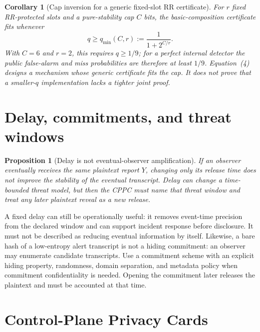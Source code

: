 \documentclass[11pt]{article}
\newtheorem{corollary}{Corollary}
\newtheorem{proposition}{Proposition}
\begin{document}
\begin{corollary}[Cap inversion for a generic fixed-slot RR certificate]
\label{cor:rr-cap-inversion}
For $r$ fixed RR-protected slots and a pure-stability cap $C$ bits, the basic-composition certificate fits whenever
\[
q\ge q_{\min}(C,r):=\frac{1}{1+2^{C/r}}.
\tag{4}
\]
With $C=6$ and $r=2$, this requires $q\ge1/9$; for a perfect internal detector the public false-alarm and miss probabilities are therefore at least $1/9$.
Equation~(4) designs a mechanism whose generic certificate fits the cap.  It does not prove that a smaller-$q$ implementation lacks a tighter joint proof.
\end{corollary}

\section{Delay, commitments, and threat windows}

\begin{proposition}[Delay is not eventual-observer amplification]
If an observer eventually receives the same plaintext report $Y$, changing only its release time does not improve the stability of the eventual transcript.
Delay can change a time-bounded threat model, but then the CPPC must name that threat window and treat any later plaintext reveal as a new release.
\end{proposition}

A fixed delay can still be operationally useful: it removes event-time precision from the declared window and can support incident response before disclosure.
It must not be described as reducing eventual information by itself.
Likewise, a bare hash of a low-entropy alert transcript is not a hiding commitment: an observer may enumerate candidate transcripts.
Use a commitment scheme with an explicit hiding property, randomness, domain separation, and metadata policy when commitment confidentiality is needed.\cite{pedersen1991distributedprovers}
Opening the commitment later releases the plaintext and must be accounted at that time.

\section{Control-Plane Privacy Cards}
\end{document}
